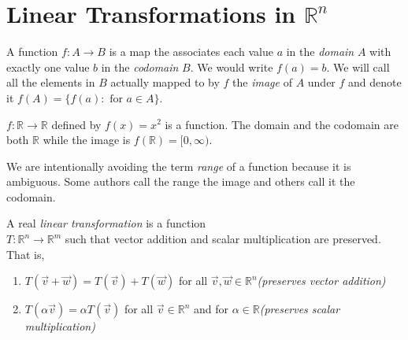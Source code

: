 \section{Linear Transformations in $\mathbb{R}^n$}

\begin{definition}[Function]
A function $f:A \to B$ is a map the associates each value $a$ in the  
\emph{domain} $A$ with exactly one value $b$ in the \emph{codomain} $B$. 
We would write $f(a)=b$. We will call all the elements in $B$ actually mapped 
to by $f$ the \emph{image} of $A$ under $f$ and denote it 
$f(A)=\{ f(a):\text{ for } a \in A  \}$.
\end{definition}
\begin{example}$f:\mathbb{R} \to \mathbb{R}$ defined by $f(x)=x^2$ is a 
function. The domain  and the codomain are both $\mathbb{R}$ while the 
image is $f(\mathbb{R})=[0,\infty )$.
\end{example}
\begin{remark}
We are intentionally avoiding the term \emph{range} of a function because it is 
ambiguous. Some authors call the range the image and others call it the 
codomain.
\end{remark}
\begin{definition}
A real \emph{linear transformation} is a function\\ 
$T: \mathbb{R}^n \to \mathbb{R}^m$ such that vector addition and scalar 
multiplication are preserved. That is, 
\begin{enumerate}
\item $T(\vec{v}+\vec{w})=T(\vec{v})+T(\vec{w})$ for all 
$\vec{v},\vec{w} \in \mathbb{R}^n$\hfill \emph{(preserves vector addition)}
\item $T(\alpha\vec{v})=\alpha T(\vec{v})$ for all $\vec{v}\in \mathbb{R}^n$ 
and for $\alpha \in \mathbb{R}$\hfill \emph{(preserves scalar multiplication)}
\end{enumerate}
\end{definition}

